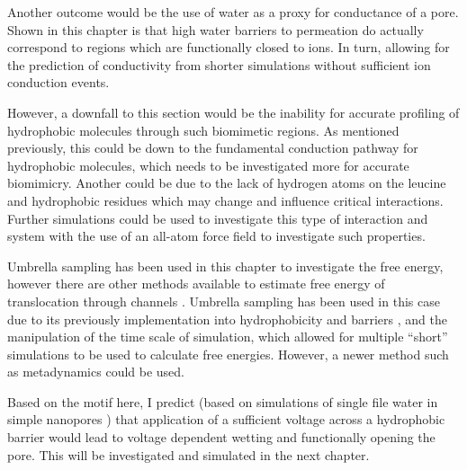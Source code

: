 Another outcome would be the use of water as a proxy for conductance of a pore. Shown in this chapter is that high water barriers to permeation do actually correspond to regions which are functionally closed to ions. In turn, allowing for the prediction of conductivity from shorter simulations without sufficient ion conduction events.

However, a downfall to this section would be the inability for accurate profiling of hydrophobic molecules through such biomimetic regions. As mentioned previously, this could be down to the fundamental conduction pathway for hydrophobic molecules, which needs to be investigated more for accurate biomimicry. Another could be due to the lack of hydrogen atoms on the leucine and hydrophobic residues which may change and influence critical interactions. Further simulations could be used to investigate this type of interaction and system with the use of an all-atom force field to investigate such properties. 

Umbrella sampling has been used in this chapter to investigate the free energy, however there are other methods available to estimate free energy of translocation through channels \cite{Domene2009}. Umbrella sampling has been used in this case due to its previously implementation into hydrophobicity and barriers \cite{Beckstein2006b}, and the manipulation of the time scale of simulation, which allowed for multiple ``short'' simulations to be used to calculate free energies. However, a newer method such as metadynamics \cite{Laio2002,Piccinini2008} could be used. 

Based on the motif here, I predict (based on simulations of single file water in simple nanopores \cite{Vaitheeswaran2004f,Dzubiella2004d}) that application of a sufficient voltage across a hydrophobic barrier would lead to voltage dependent wetting and functionally opening the pore. This will be investigated and simulated in the next chapter. 
 
